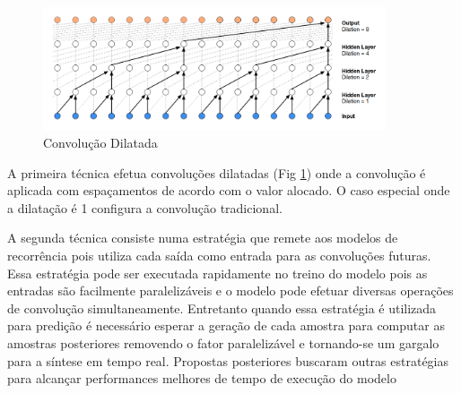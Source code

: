 \begin{figure}[h]
    \centering
    \includegraphics[width=0.9\textwidth]{figuras/dilataded_conv.png}
    \caption{Convolução Dilatada}
    \label{fig:dilatated}
\end{figure}

A primeira técnica efetua convoluções dilatadas (Fig \ref{fig:dilatated}) onde a convolução é aplicada  com espaçamentos de acordo com o valor alocado. O caso especial onde a dilatação é 1 configura a convolução tradicional.

A segunda técnica consiste numa estratégia que remete aos modelos de recorrência pois utiliza cada saída como entrada para as convoluções futuras. Essa estratégia pode ser executada rapidamente no treino do modelo pois as entradas são facilmente paralelizáveis e o modelo pode efetuar diversas operações de convolução simultaneamente. Entretanto quando essa estratégia é utilizada para predição é necessário esperar a geração de cada amostra para computar as amostras posteriores removendo o fator paralelizável e tornando-se um gargalo para a síntese em tempo real. Propostas posteriores \cite{deepVoice, wavenet_parallel:DBLP:journals/corr/abs-1711-10433} buscaram outras estratégias para alcançar performances melhores de tempo de execução do modelo





